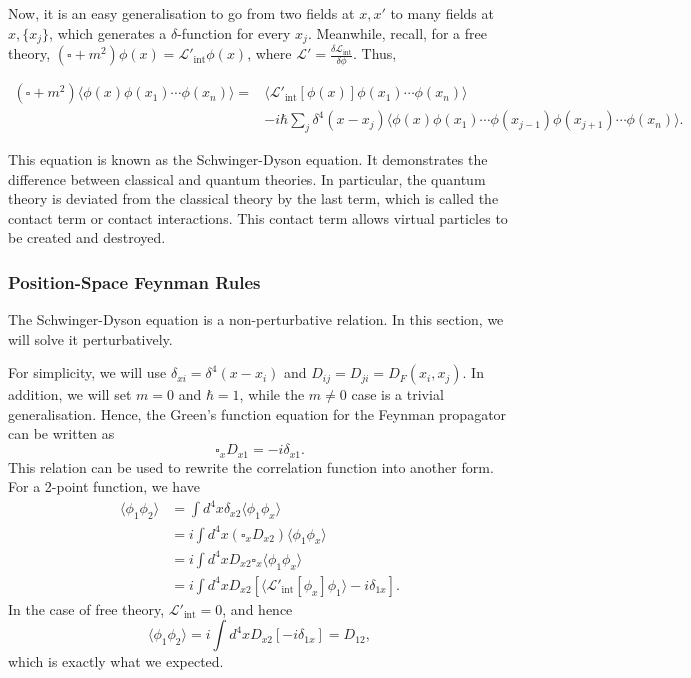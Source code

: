 \documentclass[11pt]{article}
\theoremstyle{definition}
\begin{document}
Now, it is an easy generalisation to go from two fields at $x, x'$ to many fields at $x, \{x_j\}$, which generates a $\delta$-function for every $x_j$. Meanwhile, recall, for a free theory, $(\square+m^2)\phi(x)=\mathcal{L'}_{\text{int}}\phi(x)$, where $\mathcal{L}' = \frac{\delta\mathcal{L}_{\text{int}}}{\delta\phi}$. Thus,
\begin{shaded}
    \begin{equation}
    \begin{aligned}
        (\square+m^2)\langle\phi(x)\phi(x_1)\cdots\phi(x_n)\rangle =& \langle\mathcal{L}'_{\text{int}}[\phi(x)]\phi(x_1)\cdots\phi(x_n)\rangle \\
        &-i\hbar\sum_j\delta^4(x-x_j)\langle\phi(x)\phi(x_1)\cdots\phi(x_{j-1})\phi(x_{j+1}) \cdots \phi(x_n)\rangle.
         \end{aligned}
    \end{equation}
\end{shaded}
This equation is known as the Schwinger-Dyson equation. It demonstrates the difference between classical and quantum theories. In particular, the quantum theory is deviated from the classical theory by the last term, which is called the contact term or contact interactions. This contact term allows virtual particles to be created and destroyed.

\subsubsection{Position-Space Feynman Rules}
The Schwinger-Dyson equation is a non-perturbative relation. In this section, we will solve it perturbatively. 

For simplicity, we will use $\delta_{xi} = \delta^4(x-x_i)$ and $D_{ij}=D_{ji}=D_F(x_i,x_j)$. In addition, we will set $m=0$ and $\hbar=1$, while the $m \neq 0$ case is a trivial generalisation. Hence, the Green's function equation for the Feynman propagator can be written as
\begin{equation}
    \square_xD_{x1} = -i\delta_{x1}.
\end{equation}
This relation can be used to rewrite the correlation function into another form. For a 2-point function, we have
\begin{equation}
\begin{aligned}
        \langle\phi_1\phi_2\rangle &= \int d^4x \delta_{x2}\langle\phi_1\phi_x\rangle \\
        &= i\int d^4x (\square_x D_{x2}) 
        \langle\phi_1\phi_x\rangle \\
        &= i\int d^4x  D_{x2}\square_x \langle\phi_1\phi_x\rangle \\
        &= i \int d^4x D_{x2} [\langle \mathcal{L}'_{\text{int}}[\phi_x]\phi_1\rangle -i\delta_{1x}].
        \label{Eq. PSFR 1}
\end{aligned}
\end{equation}
In the case of free theory, $\mathcal{L}'_{\text{int}} = 0$, and hence
\begin{equation}
    \langle\phi_1\phi_2\rangle = i \int d^4x D_{x2}[-i\delta_{1x}] = D_{12},
    \label{Eq. PSFR 3}
\end{equation}
which is exactly what we expected.
\end{document}
